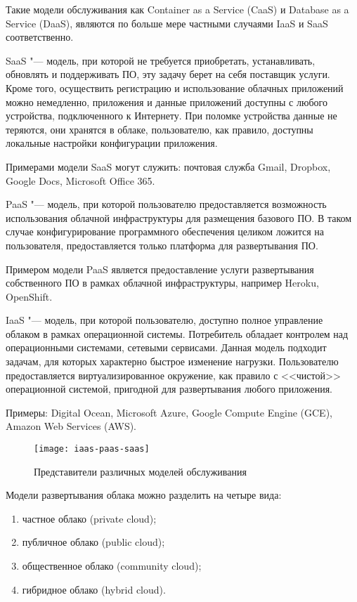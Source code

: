 Такие модели обслуживания как Container as a Service (CaaS) и Database as a Service (DaaS), являются по больше мере частными случаями IaaS и SaaS соответственно.

SaaS "--- модель, при которой не требуется приобретать, устанавливать, обновлять и поддерживать ПО, эту задачу берет на себя поставщик услуги.
Кроме того, осуществить регистрацию и использование облачных приложений можно немедленно, приложения и данные приложений доступны с любого устройства, подключенного к Интернету.
При поломке устройства данные не теряются, они хранятся в облаке, пользователю, как правило, доступны локальные настройки конфигурации приложения.

Примерами модели SaaS могут служить: почтовая служба Gmail, Dropbox, Google Docs, Microsoft Office 365.

PaaS "--- модель, при которой пользователю предоставляется возможность использования облачной инфраструктуры для размещения базового ПО.
В таком случае конфигурирование программного обеспечения целиком ложится на пользователя, предоставляется только платформа для развертывания ПО.

Примером модели PaaS является предоставление услуги развертывания собственного ПО в рамках облачной инфраструктуры, например Heroku, OpenShift.

IaaS "--- модель, при которой пользователю, доступно полное управление облаком в рамках операционной системы.
Потребитель обладает контролем над операционными системами, сетевыми сервисами.
Данная модель подходит задачам, для которых характерно быстрое изменение нагрузки.
Пользователю предоставляется виртуализированное окружение, как правило с <<чистой>> операционной системой, пригодной для развертывания любого приложения.

Примеры: Digital Ocean, Microsoft Azure, Google Compute Engine (GCE), Amazon Web Services (AWS).

\begin{figure}[ht]
    \centering
	\texttt{[image: iaas-paas-saas]}
	\caption{Представители различных моделей обслуживания}\label{pic:iaas-paas-saas}
\end{figure}

Модели развертывания облака можно разделить на четыре вида:
\begin{enumerate}
    \item частное облако (private cloud);
    \item публичное облако (public cloud);
    \item общественное облако (community cloud);
    \item гибридное облако (hybrid cloud).
\end{enumerate}

